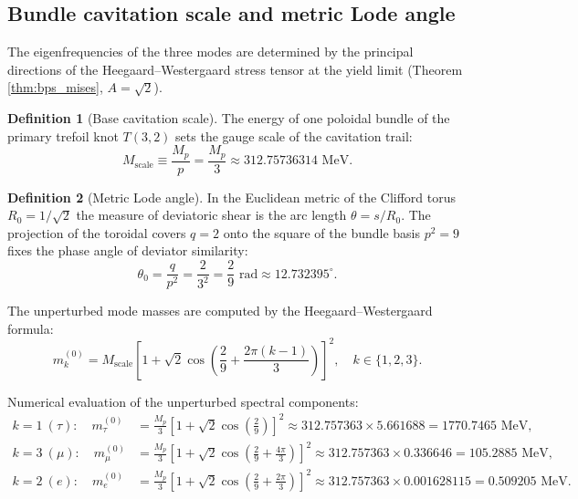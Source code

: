 \documentclass[11pt,a4paper]{article}
\theoremstyle{definition}
\newtheorem{definition}{Definition}
\theoremstyle{remark}
\begin{document}
\subsection{Bundle cavitation scale and metric Lode angle}
	
The eigenfrequencies of the three modes are determined by the principal directions of the Heegaard--Westergaard stress tensor at the yield limit (Theorem \ref{thm:bps_mises}, $A = \sqrt{2}$).
	
\begin{definition}[Base cavitation scale]
The energy of one poloidal bundle of the primary trefoil knot $T(3,2)$ sets the gauge scale of the cavitation trail:
\begin{equation}
	M_{\mathrm{scale}} \equiv \frac{M_p}{p} = \frac{M_p}{3} \approx 312.75736314\text{ MeV}.
\label{eq:m_scale_definition}
\end{equation}
\end{definition}
	
\begin{definition}[Metric Lode angle]
In the Euclidean metric of the Clifford torus $R_0 = 1/\sqrt{2}$ the measure of deviatoric shear is the arc length $\theta = s / R_0$. The projection of the toroidal covers $q=2$ onto the square of the bundle basis $p^2 = 9$ fixes the phase angle of deviator similarity:
\begin{equation}
	\theta_0 = \frac{q}{p^2} = \frac{2}{3^2} = \frac{2}{9}\text{ rad} \approx 12.732395^\circ.
	\label{eq:lode_angle_exact}
\end{equation}
\end{definition}
	
The unperturbed mode masses are computed by the Heegaard--Westergaard formula:
\begin{equation}
	m_k^{(0)} = M_{\mathrm{scale}} \left[ 1 + \sqrt{2} \cos\left( \frac{2}{9} + \frac{2\pi(k-1)}{3} \right) \right]^2, \quad k \in \{1, 2, 3\}.
	\label{eq:bare_lepton_masses}
\end{equation}
	
Numerical evaluation of the unperturbed spectral components:
\begin{align}
	k=1 \ (\tau): \quad m_\tau^{(0)} &= \frac{M_p}{3} \left[ 1 + \sqrt{2}\cos\left(\frac{2}{9}\right) \right]^2 \approx 312.757363 \times 5.661688 = 1770.7465\text{ MeV}, \label{eq:tau_bare_calc} \\
	k=3 \ (\mu): \quad m_\mu^{(0)} &= \frac{M_p}{3} \left[ 1 + \sqrt{2}\cos\left(\frac{2}{9} + \frac{4\pi}{3}\right) \right]^2 \approx 312.757363 \times 0.336646 = 105.2885\text{ MeV}, \label{eq:muon_bare_calc} \\
	k=2 \ (e): \quad m_e^{(0)} &= \frac{M_p}{3} \left[ 1 + \sqrt{2}\cos\left(\frac{2}{9} + \frac{2\pi}{3}\right) \right]^2 \approx 312.757363 \times 0.001628115 = 0.509205\text{ MeV}. \label{eq:electron_bare_calc}
\end{align}
	
\end{document}
